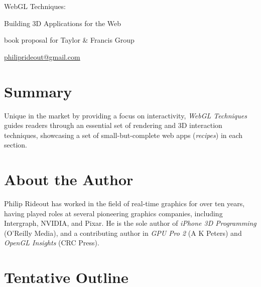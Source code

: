\thispagestyle{empty}
\label{Proposal}
\LARGE
\noindent WebGL Techniques:

\large
\noindent Building 3D Applications for the Web
\small

\vspace{0.25in}
\noindent book proposal for Taylor & Francis Group

\noindent \href{mailto:philiprideout@gmail.com}{philiprideout@gmail.com}
\normalsize

\section*{Summary}
Unique in the market by providing a focus on interactivity, \emph{WebGL Techniques} guides readers through an essential set of rendering and 3D interaction techniques, showcasing a set of small-but-complete web apps (\emph{recipes}) in each section.

\section*{About the Author}

Philip Rideout has worked in the field of real-time graphics for over ten years, having played roles at several pioneering graphics companies, including Intergraph, NVIDIA, and Pixar.  He is the sole author of \emph{iPhone 3D Programming} (O'Reilly Media), and a contributing author in \emph{GPU Pro 2} (A K Peters) and \emph{OpenGL Insights} (CRC Press).

\section*{Tentative Outline}

